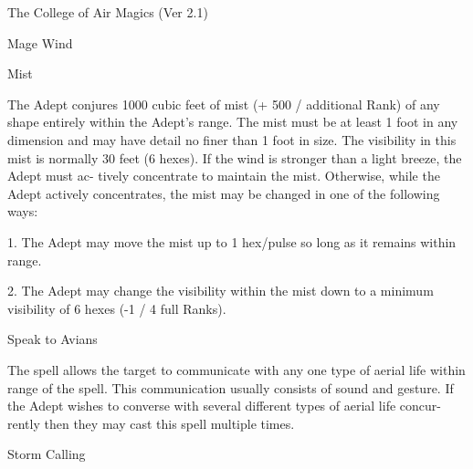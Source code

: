 \begin{Chapter}{The College of Air Magics (Ver 2.1)}
\begin{spell}[G-3]{Mage Wind }
\begin{effects}
\end{effects}
\end{spell}

\begin{spell}[G-4]{Mist }

\begin{effects}
The Adept conjures 1000 cubic feet of mist 
(+  500  /  additional  Rank)  of  any  shape  entirely 
within the Adept’s range. The mist must be at least 
1  foot  in  any  dimension  and  may  have  detail  no 
finer than 1 foot in size. The visibility in this mist 
is  normally  30  feet  (6  hexes).  If  the  wind  is 
stronger  than  a  light  breeze,  the  Adept  must  ac-
tively concentrate to maintain the mist. Otherwise, 
while  the  Adept  actively  concentrates,  the  mist 
may be changed in one of the following ways: 

1. The Adept may move the mist up to 1 hex/pulse 
so long as it remains within range. 

2.  The  Adept  may  change  the  visibility  within  the 
mist down to a minimum visibility of 6 hexes (-1 / 
4 full Ranks). 

\end{effects}
\end{spell}

\begin{spell}[G-5]{Speak to Avians }

\begin{effects}
The spell allows the target to communicate 
with any one type of aerial life within range of the 
spell.  This  communication  usually  consists  of 
sound and gesture. If the Adept wishes to converse 
with  several  different  types  of  aerial  life  concur-
rently then they may cast this spell multiple times. 

\end{effects}
\end{spell}

\begin{spell}[G-6]{Storm Calling }


\end{spell}
\end{Chapter}
